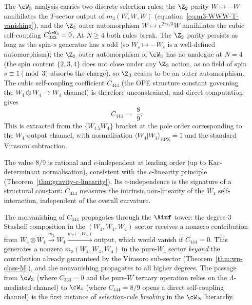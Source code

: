 \begin{computation}
\label{comp:w4-cubic-self-coupling}%
%
%
%
The $\cW_3$ analysis carries two discrete selection rules:
the $\Z_2$ parity $W \mapsto -W$ annihilates the $T$-sector
output of $m_3(W,W,W)$ (equation~\eqref{eq:m3-WWW-T-vanishing}),
and the $\Z_3$ outer automorphism $W \mapsto e^{2\pi i/3}W$
annihilates the cubic self-coupling $C_{333}^{\cW_3} = 0$.
At $N \ge 4$ both rules break. The $\Z_2$ parity
persists as long as the spin-$s$ generator has $s$ odd
(so $W_s \mapsto -W_s$ is a well-defined automorphism);
the $\Z_3$ outer automorphism of $\cW_3$ has no analogue at
$N = 4$ (the spin content $\{2, 3, 4\}$ does not close under
any $\Z_3$ action, as no field of spin $s \equiv 1 \pmod{3}$
absorbs the charge), so $\Z_3$ ceases to be an outer
automorphism. The cubic self-coupling coefficient $C_{444}$
(the OPE structure constant governing the
$W_4 \otimes W_4 \to W_4$ channel) is therefore unconstrained,
and direct computation gives
\begin{equation}\label{eq:C444-value}
C_{444}
\;=\;
\frac{8}{9}.
\end{equation}
This is extracted from the $\{W_{4\,\lambda} W_4\}$ bracket
at the pole order corresponding to the $W_4$-output channel,
with normalisation $\langle W_4 | W_4 \rangle_{\mathrm{BPZ}} = 1$
and the standard Virasoro subtraction.

The value $8/9$ is rational and $c$-independent at leading order
(up to Kac-determinant normalisation), consistent with the
$c$-linearity principle
(Theorem~\ref{thm:gravity-c-linearity}). Its
$c$-independence is the signature of a structural constant:
$C_{444}$ measures the intrinsic non-linearity of the $W_4$
self-interaction, independent of the overall curvature.

The nonvanishing of $C_{444}$ propagates through the $\Ainf$
tower: the degree-$3$ Stasheff composition in the
$(W_4, W_4, W_4)$ sector receives a nonzero contribution from
$W_4 \otimes W_4 \xrightarrow{m_2}
W_4 \xrightarrow{m_2(\cdot, W_4)} \mathrm{output}$, which
would vanish if $C_{444} = 0$. This generates a nonzero
$m_3(W_4, W_4, W_4)$ in the pure-$W_4$ sector \emph{beyond}
the contribution already guaranteed by the Virasoro
sub-sector (Theorem~\ref{thm:wn-class-M}), and the
nonvanishing propagates to all higher degrees. The passage
from $\cW_3$ (where $C_{333} = 0$ and the pure-$W$ ternary
operation relies on the $\Lambda$-mediated channel) to
$\cW_4$ (where $C_{444} = 8/9$ opens a direct self-coupling
channel) is the first instance of \emph{selection-rule
breaking} in the $\cW_N$ hierarchy.
\end{computation}

